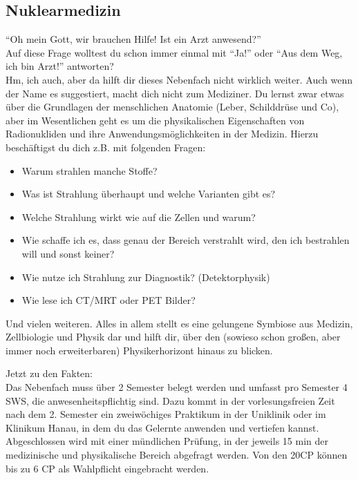 \newpage
\subsection{Nuklearmedizin}  %

"`Oh mein Gott, wir brauchen Hilfe! Ist ein Arzt anwesend?"'\\
Auf diese Frage wolltest du schon immer einmal mit "`Ja!"' oder "`Aus dem Weg, ich bin Arzt!"' antworten?\\
Hm, ich auch, aber da hilft dir dieses Nebenfach nicht wirklich weiter.
Auch wenn der Name es suggestiert,  macht dich nicht zum Mediziner.
Du lernst zwar etwas \"uber die Grundlagen der menschlichen Anatomie (Leber, Schilddr\"use und Co), 
aber im Wesentlichen geht es um die physikalischen Eigenschaften von Radionukliden 
und ihre Anwendungsm\"oglichkeiten in der Medizin.
Hierzu besch\"aftigst du dich z.B. mit folgenden Fragen:

\begin{itemize}
  \item{Warum strahlen manche Stoffe?}
  \item{Was ist Strahlung \"uberhaupt und welche Varianten gibt es?}
  \item{Welche Strahlung wirkt wie auf die Zellen und warum?}
  \item{Wie schaffe ich es, dass genau der Bereich verstrahlt wird, den ich bestrahlen will und sonst keiner?}
  \item{Wie nutze ich Strahlung zur Diagnostik? (Detektorphysik)}
  \item{Wie lese ich CT/MRT oder PET Bilder?}
\end{itemize}

Und vielen weiteren.
Alles in allem stellt es eine gelungene Symbiose aus Medizin, Zellbiologie und Physik dar 
und hilft dir, \"uber den (sowieso schon großen, aber immer noch erweiterbaren) Physikerhorizont hinaus zu blicken.

\vspace{1em}

Jetzt zu den Fakten:\\
Das Nebenfach muss \"uber 2 Semester belegt werden und umfasst pro Semester 4 SWS, die anwesenheitspflichtig sind.
Dazu kommt in der vorlesungsfreien Zeit nach dem 2. Semester ein zweiw\"ochiges Praktikum 
in der Uniklinik oder im Klinikum Hanau, in dem du das Gelernte anwenden und vertiefen kannst.\\
Abgeschlossen wird  mit einer m\"undlichen Pr\"ufung, 
in der jeweils 15 min der medizinische und physikalische Bereich abgefragt werden.
Von den 20CP können bis zu 6 CP als Wahlpflicht eingebracht werden.
